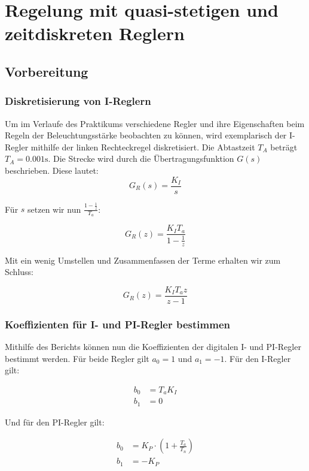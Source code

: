 \documentclass{report}
\begin{document}
\newpage

\tableofcontents

\listoffigures
\newpage
\chapter{Regelung mit quasi-stetigen und zeitdiskreten Reglern}
\section{Vorbereitung}
\subsection{Diskretisierung von I-Reglern}
\label{sec:diskr-von-i}


Um im Verlaufe des Praktikums verschiedene Regler und ihre Eigenschaften beim Regeln der Beleuchtungsstärke beobachten zu können, wird exemplarisch der I-Regler mithilfe der linken Rechteckregel diskretisiert. Die Abtastzeit $T_A$ beträgt $T_A = 0.001\mathrm{s}$. Die Strecke wird durch die Übertragungsfunktion $G(s)$ beschrieben. Diese lautet:
$$G_{R}(s) = \frac{K_{I}}{s}$$

Für $s$ setzen wir nun $\frac{1-\frac{1}{z}}{T_{a}}$:

$$G_{R}(z) = \frac{K_{I}T_{a}}{1-\frac{1}{z}}$$

Mit ein wenig Umstellen und Zusammenfassen der Terme erhalten wir zum Schluss:

$$G_{R}(z) = \frac{K_{I}T_{a}z}{z-1}$$

\subsection{Koeffizienten für I- und PI-Regler bestimmen}
\label{sec:koeffizienten-fur-i}

Mithilfe des Berichts können nun die Koeffizienten der digitalen I- und PI-Regler bestimmt werden. Für beide Regler gilt $a_{0} = 1$ und $a_{1} = -1$. Für den I-Regler gilt:

\begin{align}
  \label{eq:1}
  b_{0} &= T_{a}K_{I}\\
  b_{1} &= 0
\end{align}

Und für den PI-Regler gilt:

\begin{align}
  \label{eq:2}
  b_{0} &= K_{P} \cdot (1 + \frac{T_{a}}{T_{n}})\\
  b_{1} &= -K_{P}
\end{align}
\end{document}
